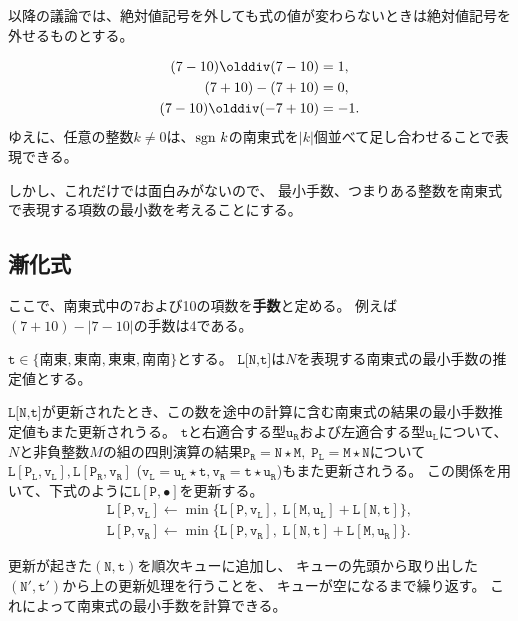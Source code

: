 \documentclass[10pt,dvipdfmx]{ujarticle}
\begin{document}
以降の議論では、絶対値記号を外しても式の値が変わらないときは絶対値記号を外せるものとする。

\begin{lemma}[$1,0,-1$の南東式表現]
    \begin{subequations}
        \begin{align}
            (7-10)\olddiv(7-10)  & =1,  \\
            (7+10)-(7+10)        & =0,  \\
            (7-10)\olddiv(-7+10) & =-1.
        \end{align}
    \end{subequations}
    ゆえに、任意の整数$k\neq 0$は、${\rm sgn~}k$の南東式を$|k|$個並べて足し合わせることで表現できる。
\end{lemma}

しかし、これだけでは面白みがないので、%
最小手数、つまりある整数を南東式で表現する項数の最小数を考えることにする。

\subsection{漸化式}
ここで、南東式中の7および10の項数を\textbf{手数}と定める。
例えば$(7+10)-|7-10|$の手数は4である。

$\texttt{t}\in\{南東, 東南, 東東, 南南\}$とする。
$\texttt{L[N,t]}$は$N$を表現する南東式の最小手数の推定値とする。

$\texttt{L[N,t]}$が更新されたとき、この数を途中の計算に含む南東式の結果の最小手数推定値もまた更新されうる。
$\mathtt{t}$と右適合する型$\mathtt{u_R}$および左適合する型$\mathtt{u_L}$について、
$N$と非負整数$M$の組の四則演算の結果$\mathtt{P_R}=\mathtt{N}\star \mathtt{M},\;\mathtt{P_L}=\mathtt{M}\star \mathtt{N}$について
$\mathtt{L[P_L,v_L]}, \mathtt{L[P_R,v_R]}$
($\mathtt{v_L}=\mathtt{u_L}\star \mathtt{t}, \mathtt{v_R}=\mathtt{t}\star \mathtt{u_R}$)もまた更新されうる。
この関係を用いて、下式のように$\mathtt{L[P,\bullet]}$を更新する。
\begin{equation}
    \begin{aligned}
        \mathtt{L[P,v_L]}\leftarrow\min\{\mathtt{L[P,v_L]},\;\mathtt{L[M,u_L]}+\mathtt{L[N,t]}\}, \\
        \mathtt{L[P,v_R]}\leftarrow\min\{\mathtt{L[P,v_R]},\;\mathtt{L[N,t]}+\mathtt{L[M,u_R]}\}.
    \end{aligned}
\end{equation}

更新が起きた$\mathtt{(N,t)}$を順次キューに追加し、
キューの先頭から取り出した$\mathtt{(N',t')}$から上の更新処理を行うことを、
キューが空になるまで繰り返す。
これによって南東式の最小手数を計算できる。
\end{document}
